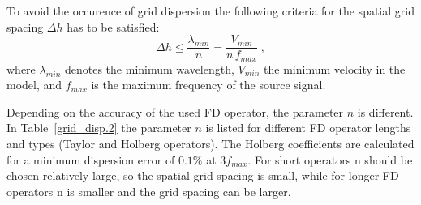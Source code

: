 To avoid the occurence of grid dispersion the following criteria for the spatial grid spacing $\Delta h$ has to be satisfied:
\begin{equation}
    \Delta h \le \frac{\lambda_{min}}{n} = \frac{V_{min}}{{n}\,f_{max}}\;,
    \label{eq:dh}
\end{equation}
where $\lambda_{min}$ denotes the minimum wavelength, $V_{min}$ the minimum velocity in the model, and $f_{max}$ is the maximum frequency of the source signal.  

Depending on the accuracy of the used FD operator, the parameter $n$ is different. In Table~\ref{grid_disp.2} the parameter $n$ is listed for different FD operator lengths and types (Taylor and Holberg operators). The Holberg coefficients are calculated for a minimum dispersion error of $0.1\%$ at $3 f_{max}$. For short operators n should be chosen relatively large, so the spatial grid spacing is small, while for longer FD operators n is smaller and the grid spacing can be larger. 
